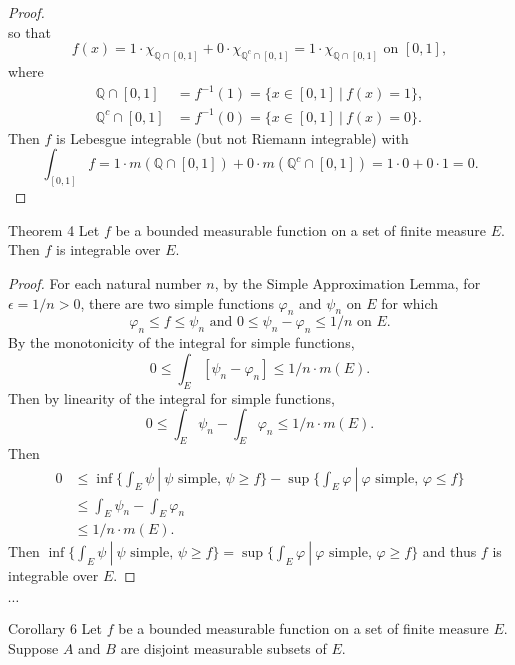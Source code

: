 \begin{flushleft}
\begin{proof}
\[        \] 
        so that 
        \[
            f(x)=1\cdot\chi_{\mathbb{Q}\cap[0,1]}+0\cdot\chi_{\mathbb{Q}^c\cap[0,1]}=1\cdot\chi_{\mathbb{Q}\cap[0,1]}\text{ on }[0,1],
        \]
        where
        \begin{align*}
            \mathbb{Q}\cap[0,1]&=f^{-1}(1)=\{x\in [0,1]\ |\ f(x)=1\},\\
            \mathbb{Q}^c\cap[0,1]&=f^{-1}(0)=\{x\in [0,1]\ |\ f(x)=0\}.
        \end{align*}
        Then $f$ is Lebesgue integrable (but not Riemann integrable) with
        \[
            \int_{[0,1]}f=1\cdot m(\mathbb{Q}\cap[0,1])+0\cdot m(\mathbb{Q}^c\cap[0,1])=1\cdot0+0\cdot1=0.
        \]
    \end{proof}
    \begin{namedthm*}{Theorem 4}    
        Let $f$ be a bounded measurable function on a set of finite measure $E$.
        Then $f$ is integrable over $E$.
    \end{namedthm*}
    \begin{proof}
        For each natural number $n$, by the Simple Approximation Lemma, for $\epsilon=1/n>0$, there are two simple functions $\varphi_n$ and $\psi_n$ on $E$ for which
        \[
            \varphi_n\le f\le\psi_n\text{ and }0\le\psi_n-\varphi_n\le1/n\text{ on }E.    
        \]
        By the monotonicity of the integral for simple functions,
        \[
            0\le\int_E[\psi_n-\varphi_n]\le1/n\cdot m(E).       
        \]
        Then by linearity of the integral for simple functions,
        \[
            0\le\int_E\psi_n-\int_E\varphi_n\le1/n\cdot m(E).       
        \]
        Then 
        \begin{align*}
            0&\le\inf\biggl\{\int_E\psi\ |\ \psi\text{ simple, }\psi\ge f\biggr\}-\sup\biggl\{\int_E\varphi\ |\ \varphi\text{ simple, }\varphi\le f\biggr\}\\
            &\le\int_E\psi_n-\int_E\varphi_n\\
            &\le1/n\cdot m(E).       
        \end{align*}
        Then $\inf\{\int_E\psi\ |\ \psi\text{ simple, }\psi\ge f\}=\sup\{\int_E\varphi\ |\ \varphi\text{ simple, }\varphi\ge f\}$ and thus $f$ is integrable over $E$.
    \end{proof}
    $\cdots$\\\bigskip
    \begin{namedthm*}{Corollary 6}  
        Let $f$ be a bounded measurable function on a set of finite measure $E$.
        Suppose $A$ and $B$ are disjoint measurable subsets of $E$. 

\end{namedthm*}
\end{flushleft}
